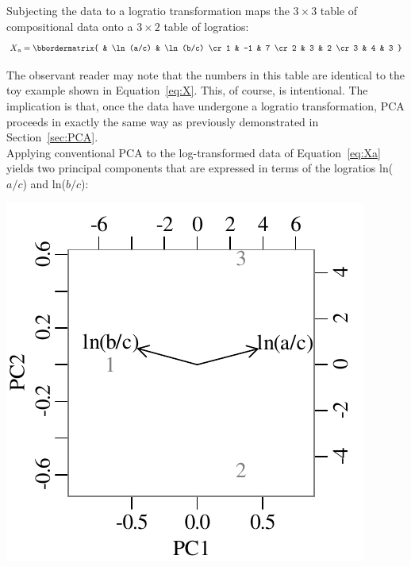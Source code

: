 Subjecting the data to a logratio transformation maps the
${3}\times{3}$ table of compositional data onto a ${3}\times{2}$ table
of logratios:
\begin{equation}
  X\textsubscript{a} =
  \bbordermatrix{ & \ln(a/c) & \ln(b/c) \cr
    1 & -1 & 7 \cr
    2 & 3 & 2 \cr
    3 & 4 & 3
  }
  \label{eq:Xa}
\end{equation}

The observant reader may note that the numbers in this table are
identical to the toy example shown in Equation~\ref{eq:X}. This, of
course, is intentional. The implication is that, once the data have
undergone a logratio transformation, PCA proceeds in exactly the same
way as previously demonstrated in Section~\ref{sec:PCA}.\\

Applying conventional PCA to the log-transformed data of
Equation~\ref{eq:Xa} yields two principal components that are
expressed in terms of the logratios ln($a/c$) and ln($b/c$):

\noindent\begin{minipage}[t][][b]{.3\textwidth}
\includegraphics[width=\textwidth]{../figures/alrPCA.pdf}\\
\end{minipage}
\begin{minipage}[t][][t]{.7\textwidth}
  \label{fig:alrPCA}
\end{minipage}

